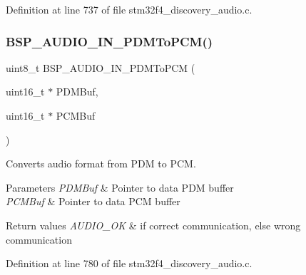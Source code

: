 Definition at line 737 of file stm32f4\+\_\+discovery\+\_\+audio.\+c.

\mbox{\label{group___s_t_m32_f4___d_i_s_c_o_v_e_r_y___a_u_d_i_o___i_n___exported___functions_ga778fc1e32ffc40c6d779e637a80a7dac}} 
\subsubsection{\texorpdfstring{B\+S\+P\+\_\+\+A\+U\+D\+I\+O\+\_\+\+I\+N\+\_\+\+P\+D\+M\+To\+P\+C\+M()}{BSP\_AUDIO\_IN\_PDMToPCM()}}
{\footnotesize\ttfamily uint8\+\_\+t B\+S\+P\+\_\+\+A\+U\+D\+I\+O\+\_\+\+I\+N\+\_\+\+P\+D\+M\+To\+P\+CM (\begin{DoxyParamCaption}\item[{uint16\+\_\+t $\ast$}]{P\+D\+M\+Buf,  }\item[{uint16\+\_\+t $\ast$}]{P\+C\+M\+Buf }\end{DoxyParamCaption})}



Converts audio format from P\+DM to P\+CM. 


\begin{DoxyParams}{Parameters}
{\em P\+D\+M\+Buf} & Pointer to data P\+DM buffer \\
\hline
{\em P\+C\+M\+Buf} & Pointer to data P\+CM buffer \\
\hline
\end{DoxyParams}

\begin{DoxyRetVals}{Return values}
{\em A\+U\+D\+I\+O\+\_\+\+OK} & if correct communication, else wrong communication \\
\hline
\end{DoxyRetVals}


Definition at line 780 of file stm32f4\+\_\+discovery\+\_\+audio.\+c.

